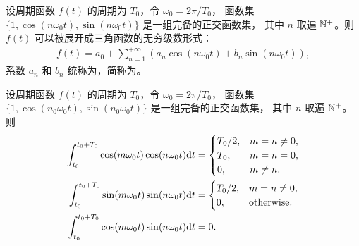 \begin{definition}[三角形式傅里叶级数]
    设周期函数 $f(t)$ 的周期为 $T_0$，令 $\omega_0 = 2\pi/T_0$，
    函数集 $\{1, \cos(n\omega_0 t), \sin(n\omega_0 t)\}$ 是一组完备的正交函数集，
    其中 $n$ 取遍 $\mathbb{N}^{+}$。则 $f(t)$ 可以被展开成三角函数的无穷级数形式：
    \begin{align*}
        f(t) = a_0 + \sum_{n = 1}^{+\infty}(a_n\cos(n\omega_0 t) + b_n\sin(n\omega_0 t)),
    \end{align*}
    系数 $a_n$ 和 $b_n$ 统称为，简称为。
\end{definition}

\begin{lemma}
    设周期函数 $f(t)$ 的周期为 $T_0$，令 $\omega_0 = 2\pi/T_0$，
    函数集 $\{1, \cos(n_0\omega_0 t), \sin(n_0\omega_0 t)\}$ 是一组完备的正交函数集，
    其中 $n$ 取遍 $\mathbb{N}^{+}$。则
    \begin{align*}
        \int_{t_0}^{t_0 + T_0}\cos(m\omega_0 t)\cos (n\omega_0 t)\mathrm{d}{t} & = \begin{cases}
            T_0 / 2, & m = n \neq 0, \\
            T_0, & m = n = 0, \\
            0, & m \neq n.
        \end{cases} \\
        \int_{t_0}^{t_0 + T_0}\sin(m\omega_0 t)\sin (n\omega_0 t)\mathrm{d}{t} & = \begin{cases}
            T_0 / 2, & m = n \neq 0, \\
            0, & \text{otherwise}.
        \end{cases} \\
        \int_{t_0}^{t_0 + T_0}\cos(m\omega_0 t)\sin (n\omega_0 t)\mathrm{d}{t} & = 0.
    \end{align*}
\end{lemma}

